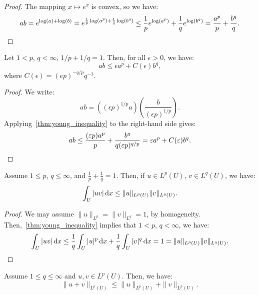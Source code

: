 \begin{proof}
  The mapping $x \mapsto e^x$ is convex, so we have:
  \[%
    ab = e^{\log(a)+\log(b)} = e^{\frac{1}{p}\log(a^p)+\frac{1}{q}\log(b^q)} \le \frac{1}{p}e^{\log(a^p)} + \frac{1}{q}e^{\log(b^q)} = \frac{a^p}{p} + \frac{b^q}{q}
  .\qedhere\]%
\end{proof}

\begin{theorem}
  \label{thm:young_inequality_epsilon}

  Let $1 < p$, $q < \infty$, $1/p + 1/q = 1$. Then, for all $\epsilon > 0$, we have:
  \begin{equation}\label{eq:young_inequality_epsilon}
    ab \le \epsilon a^p + C(\epsilon)b^q
  ,\end{equation}
  where $C(\epsilon) = (ep)^{-q/p}q^{-1}$.
\end{theorem}

\begin{proof}
  We write:
  \[%
    ab = ((\epsilon p)^{1/p}a)\left(\frac{b}{(\epsilon p)^{1/p}}\right)
  .\]%
  Applying~\cref{thm:young_inequality} to the right-hand side gives:
  \[%
    ab \le \frac{(\epsilon p)a^p}{p} + \frac{b^q}{q(\epsilon p)^{q/p}} = \epsilon a^p + C(\epsilon)b^q
  .\qedhere\]%
\end{proof}

\begin{theorem}
  \label{thm:holders_inequality}

  Assume $1 \le p$, $q \le \infty$, and $\frac{1}{p} + \frac{1}{q} = 1$. Then, if $u \in L^p(U)$, $v \in L^q(U)$, we have:
  \begin{equation}\label{eq:holders_inequality}
    \int_U |uv| \dx \le \|u\|_{L^p(U)} \|v\|_{L^q(U)}
  .\end{equation}
\end{theorem}

\begin{proof}
  We may assume $\|u\|_{L^p} = \|v\|_{L^q} = 1$, by homogeneity. Then,~\cref{thm:young_inequality} implies that $1 < p$, $q < \infty$, we have:
  \[%
    \int_U |uv| \dx \le \frac{1}{q} \int_U |u|^p \dx + \frac{1}{q} \int_U |v|^q \dx = 1 = \|u\|_{L^p(U)} \|v\|_{L^q(U)}
  .\qedhere\]%
\end{proof}

\begin{theorem}
  \label{thm:minkowski_inequality}

  Assume $1 \le q \le \infty$ and $u, v \in L^p(U)$. Then, we have:
  \begin{equation}\label{eq:minkowski_inequality}
    \|u + v\|_{L^p(U)} \le \|u\|_{L^p(U)} + \|v\|_{L^p(U)}
  .\end{equation}
\end{theorem}

